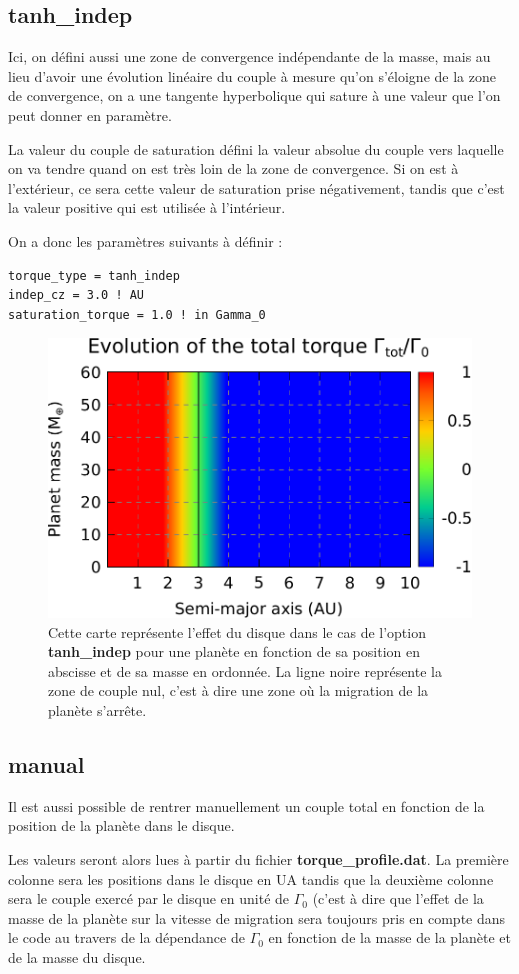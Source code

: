 \subsection{tanh\_indep}\label{sec:tanh_indep}
Ici, on défini aussi une zone de convergence indépendante de la masse, mais au lieu d'avoir une évolution linéaire du couple à mesure qu'on s'éloigne de la zone de convergence, on a une tangente hyperbolique qui sature à une valeur que l'on peut donner en paramètre. 

La valeur du couple de saturation défini la valeur absolue du couple vers laquelle on va tendre quand on est très loin de la zone de convergence. Si on est à l'extérieur, ce sera cette valeur de saturation prise négativement, tandis que c'est la valeur positive qui est utilisée à l'intérieur.

On a donc les paramètres suivants à définir : 
\begin{verbatim}
torque_type = tanh_indep
indep_cz = 3.0 ! AU
saturation_torque = 1.0 ! in Gamma_0
\end{verbatim}

\begin{figure}[htbp]
\centering
\includegraphics[width=0.65\linewidth]{figure/migration_map/tanh_indep.pdf}
\caption{Cette carte représente l'effet du disque dans le cas de l'option \textbf{tanh\_indep} pour une planète en fonction de sa position en abscisse et de sa masse en ordonnée. La ligne noire représente la zone de couple nul, c'est à dire une zone où la migration de la planète s'arrête.}
\end{figure}

\subsection{manual}
Il est aussi possible de rentrer manuellement un couple total en fonction de la position de la planète dans le disque. 

Les valeurs seront alors lues à partir du fichier \textbf{torque\_profile.dat}. La première colonne sera les positions dans le disque en \unit{UA} tandis que la deuxième colonne sera le couple exercé par le disque en unité de $\Gamma_0$ (c'est à dire que l'effet de la masse de la planète sur la vitesse de migration sera toujours pris en compte dans le code au travers de la dépendance de $\Gamma_0$ en fonction de la masse de la planète et de la masse du disque.

